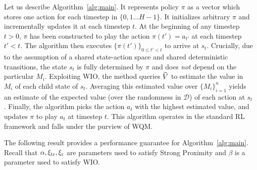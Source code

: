 \documentclass[11pt,twoside]{article}
\begin{document}
\begin{comment}
\begin{algorithm}
\caption{GenRL}
\label{alg:main}
\begin{algorithmic}[1]
\STATE \text{Inputs: horizon length $H$, distribution $\mathcal{D}$, sample size $n$}
\STATE Initialize $\pi$ as the empty function
\FOR{$t \in \{0, 1 \dots H-1 \}$}
\STATE Sample $\{ M_i \}_{i=1}^n \overset{\text{{\footnotesize i.i.d}}}{\sim} \mathcal{D}$
\FOR{$a \in \ActSet$}

\STATE Let $s'$ be the child state of $s_t$ when taking action $a$
\STATE Query $\oracle$ to obtain $\approxV{s'}{M_i}$
\STATE Store $Q_{i, a} = \Rew_{M_i}(s_t, a) + \approxV{s'}{M_i}$
\ENDFOR

\STATE Take action $a_t = \argmax_{a' \in \ActSet} \{ \frac{1}{n} \sum_{i=1}^n Q_{i, a'} \}$ and arrive at state $s_{t+1}$
\STATE Define $\pi(s_t) = a_t$
\ENDFOR
\STATE \textbf{return } $\pi$
\end{algorithmic}
\end{algorithm}
\end{comment}
\noindent Let us describe Algorithm~\ref{alg:main}. It represents policy $\pi$ as a vector which stores one action for each timestep in $\{0, 1 \dots H-1 \}$. It initializes arbitrary $\pi$ and incrementally updates it at each timestep $t$. At the beginning of any timestep $t > 0$, $\pi$ has been constructed to play the action $\pi(t') = a_{t'}$ at each timestep $t' < t$. The algorithm then executes $\{ \pi(t') \}_{0 \leq t' < t}$ to arrive at $s_t$. Crucially, due to the assumption of a shared state-action space and shared deterministic transitions, the state $s_t$ is fully determined by $\pi$ and does \emph{not} depend on the particular $M_i$. Exploiting WIO, the method queries $\widehat{V}$ to estimate the value in $M_i$ of each child state of $s_t$. Averaging this estimated value over $\{ M_i \}_{i=1}^n$ yields an estimate of the expected value (over the randomness in $\mathcal{D}$) of each action at $s_t$. Finally, the algorithm picks the action $a_t$ with the highest estimated value, and updates $\pi$ to play $a_t$ at timestep $t$. This algorithm operates in the standard RL framework and falls under the purview of WQM.

The following result provides a performance guarantee for Algorithm~\ref{alg:main}. Recall that $\alpha, \operatorname{\xi_{tr}}, \operatorname{\xi_r}$ are parameters used to satisfy Strong Proximity and $\beta$ is a parameter used to satisfy WIO.
\end{document}
